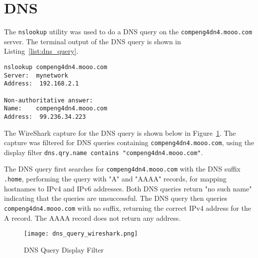 \section*{DNS}
The \texttt{nslookup} utility was used to do a DNS query on the \texttt{compeng4dn4.mooo.com} server. The terminal output of the DNS query is shown in Listing~\ref{list:dns_query}.

\begin{lstlisting}[caption=DNS Query Terminal Output,label=list:dns_query]
nslookup compeng4dn4.mooo.com
Server:  mynetwork
Address:  192.168.2.1

Non-authoritative answer:
Name:    compeng4dn4.mooo.com
Address:  99.236.34.223
\end{lstlisting}

The WireShark capture for the DNS query is shown below in Figure~\ref{fig:dns_query}. The capture was filtered for DNS queries containing \texttt{compeng4dn4.mooo.com}, using the display filter \texttt{dns.qry.name contains "compeng4dn4.mooo.com"}. 

The DNS query first searches for \texttt{compeng4dn4.mooo.com} with the DNS suffix \texttt{.home}, performing the query with "A" and "AAAA" records, for mapping hostnames to IPv4 and IPv6 addresses. Both DNS queries return "no such name" indicating that the queries are unsuccessful. The DNS query then queries \texttt{compeng4dn4.mooo.com} with no suffix, returning the correct IPv4 address for the A record. The AAAA record does not return any address.

\begin{figure}[htp]
\centering
\caption[dns_query]{DNS Query Display Filter}\label{fig:dns_query}
\texttt{[image: dns\_query\_wireshark.png]}
\end{figure}
